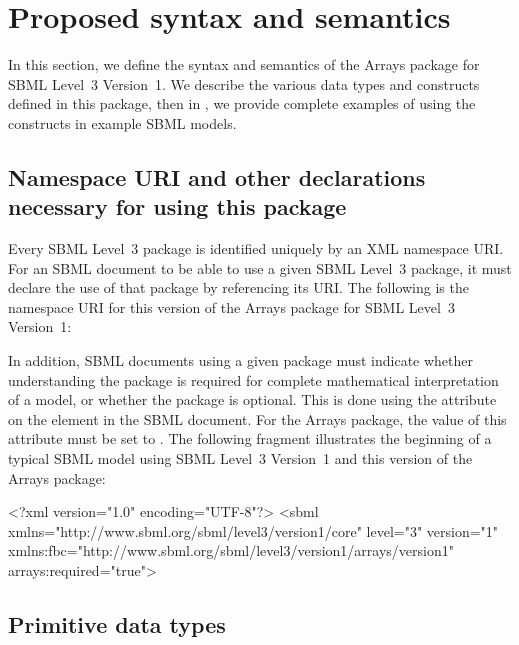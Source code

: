 
\section{Proposed syntax and semantics}
\label{syntax}

In this section, we define the syntax and semantics of the Arrays package for SBML Level~3 Version~1.  We describe the various data types and constructs defined in this package, then in , we provide complete examples of using the constructs in example SBML models.

\subsection{Namespace URI and other declarations necessary for using this package}
\label{xml-namespace}

Every SBML Level~3 package is identified uniquely by an XML namespace URI.
For an SBML document to be able to use a given SBML Level~3 package, it
must declare the use of that package by referencing its URI.  The following
is the namespace URI for this version of the Arrays
package for SBML Level~3 Version~1:
\begin{center}
\end{center}

In addition, SBML documents using a given package must indicate whether
understanding the package is required for complete mathematical
interpretation of a model, or whether the package is optional.  This is
done using the attribute  on the  element in
the SBML document.  For the Arrays package, the value of
this attribute must be set to .
The following fragment illustrates the beginning of a typical SBML model
using SBML Level~3 Version~1 and this version of the Arrays package:

\begin{example}
<?xml version="1.0" encoding="UTF-8"?>
<sbml xmlns="http://www.sbml.org/sbml/level3/version1/core" level="3" version="1"
      xmlns:fbc="http://www.sbml.org/sbml/level3/version1/arrays/version1" arrays:required="true">
\end{example}

\subsection{Primitive data types}

